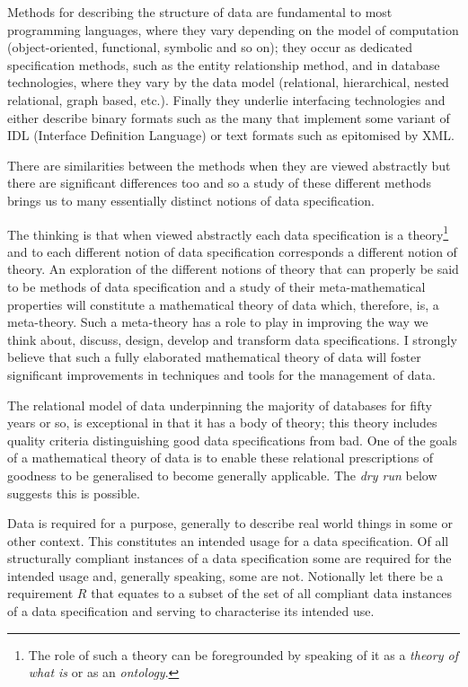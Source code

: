 \note
Methods for describing the structure of data are fundamental to most programming languages, 
where they vary depending on the model of computation (object-oriented, functional, symbolic and so on);
they occur as dedicated specification methods, such as the entity relationship method,
and  in database technologies, where they vary by the data model (relational, hierarchical, nested relational,
graph based, etc.). Finally they underlie interfacing technologies and either describe binary formats such as 
the many that implement some variant of IDL (Interface Definition Language) or text formats such as epitomised by XML. 

\note 
There are similarities between the methods when they are viewed abstractly but there are significant differences too and so a study of these different methods brings us to many essentially distinct notions of data specification.

\note
The thinking is that when viewed abstractly each data specification is a 
theory\footnote{The role of such a theory can be foregrounded by speaking of it
 as a \textit {theory of what is} or as an \textit{ontology}.} and  to each different notion of data specification corresponds a different notion of theory. An  exploration of the different notions of theory that can properly be said to be methods of data specification
and a study of their meta-mathematical properties 
 will constitute a mathematical theory of data which, therefore, is, a meta-theory. Such a meta-theory has a role to play in improving  the way we think about, discuss, design, develop and transform data specifications. I strongly believe that such a fully elaborated mathematical theory of data will foster significant improvements in  techniques and tools for the management of data. 

\note 
The relational model of data underpinning the majority of databases for fifty years or so, is exceptional in that it has a body of theory; this theory includes quality criteria  distinguishing good data specifications from bad. 
One of the goals of a mathematical theory of data is to enable these relational prescriptions of goodness
to be generalised to become generally applicable. The \textit{dry run} below suggests this is possible.

\note
Data is required for a purpose, generally to describe real world things in some or other context. This constitutes an intended usage for a data specification. Of all structurally compliant instances of a data specification some are required for the intended usage and, generally speaking, some are not.
Notionally let there be a requirement $R$ that equates to a subset of the set of all compliant data instances 
of a data specification and serving to characterise its intended use. 

